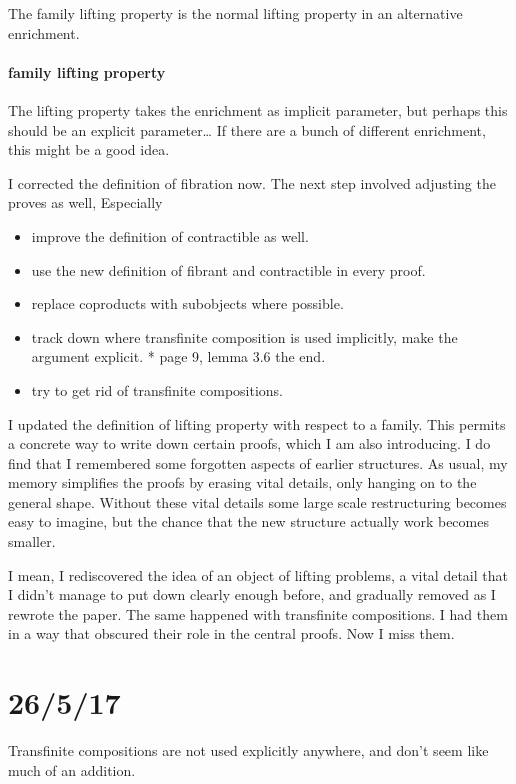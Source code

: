 \documentclass{tac}
\begin{document}
The family lifting property is the normal lifting property in an alternative enrichment.

\paragraph{family lifting property}
The lifting property takes the enrichment as implicit parameter, but perhaps this should be an explicit parameter\dots
If there are a bunch of different enrichment, this might be a good idea.


I corrected the definition of fibration now. The next step involved adjusting the proves as well,
Especially 

\begin{itemize}
\item improve the definition of contractible as well.
\item use the new definition of fibrant and contractible in every proof.
\item replace coproducts with subobjects where possible.
\item track down where transfinite composition is used implicitly, make the argument explicit.
  * page 9, lemma 3.6 the end.	
\item try to get rid of transfinite compositions.
\end{itemize}

I updated the definition of lifting property with respect to a family. This permits a concrete way to write down certain proofs, which I am also introducing.
I do find that I remembered some forgotten aspects of earlier structures. As usual, my memory simplifies the proofs by erasing vital details, only hanging on to the general shape. Without these vital details some large scale restructuring becomes easy to imagine, but the chance that the new structure actually work becomes smaller.

I mean, I rediscovered the idea of an object of lifting problems, a vital detail that I didn't manage to put down clearly enough before, and gradually removed as I rewrote the paper. The same happened with transfinite compositions. I had them in a way that obscured their role in the central proofs. Now I miss them.

\section{26/5/17}

Transfinite compositions are not used explicitly anywhere, and don't seem like much of an addition.
\end{document}
